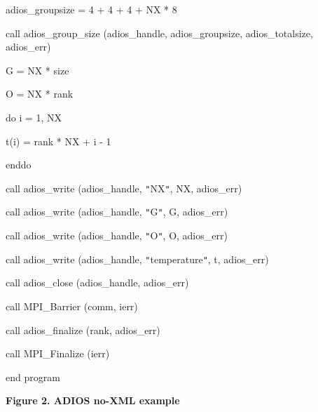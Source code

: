 \vspace{22pt}
\parindent=14pt
adios\_groupsize = 4 + 4 + 4 + NX * 8

\vspace{10pt}
call adios\_group\_size (adios\_handle, adios\_groupsize, adios\_totalsize, adios\_err)

\vspace{22pt}
\parindent=28pt
G = NX * size

\vspace{10pt}
\parindent=14pt
O = NX * rank

\vspace{10pt}
do i = 1, NX

\vspace{10pt}
\parindent=43pt
t(i)  = rank * NX + i - 1

\vspace{10pt}
\parindent=14pt
enddo

\vspace{22pt}
call adios\_write (adios\_handle, \texttt{"}NX\texttt{"}, NX, adios\_err)

\vspace{10pt}
\parindent=28pt
call adios\_write (adios\_handle, \texttt{"}G\texttt{"}, G, adios\_err)

\vspace{10pt}
\parindent=14pt
call adios\_write (adios\_handle, \texttt{"}O\texttt{"}, O, adios\_err)

\vspace{10pt}
call adios\_write (adios\_handle, \texttt{"}temperature\texttt{"}, t, adios\_err)

\vspace{22pt}
\parindent=28pt
call adios\_close (adios\_handle, adios\_err)

\vspace{22pt}
\parindent=14pt
call MPI\_Barrier (comm, ierr)

\vspace{22pt}
call adios\_finalize (rank, adios\_err)

\vspace{22pt}
\parindent=28pt
call MPI\_Finalize (ierr)

\vspace{10pt}
\parindent=0pt
end program


\vspace{22pt}
\leftskip=18pt
{\color{color20} \textbf{Figure 2. ADIOS no-XML example\label{HToc182553363}}}
